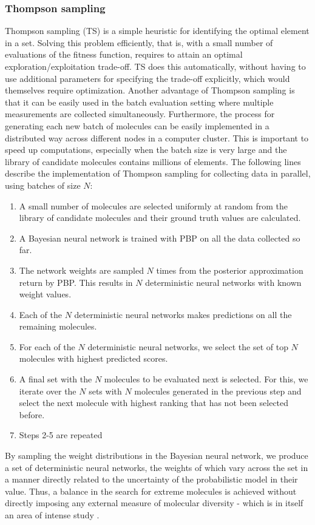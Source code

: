 \subsubsection{Thompson sampling}

Thompson sampling (TS) \cite{Thompson_1933} is a simple heuristic for identifying the optimal element in a set. Solving this problem efficiently, that is, with a small number of evaluations of the fitness function, requires to attain an optimal exploration/exploitation trade-off. TS does this automatically, without having to use additional parameters for specifying the trade-off explicitly, which would themselves require optimization. Another advantage of Thompson sampling is that it can be easily used
in the batch evaluation setting where multiple measurements are collected simultaneously. Furthermore, the process for generating each new batch of molecules can be easily implemented in a distributed way across different nodes in a computer cluster. This is important to speed up computations, especially when the batch size is very large and the library of candidate molecules contains millions of elements. The following lines describe the implementation of Thompson sampling for collecting data in parallel, using batches of size $N$:
\begin{enumerate}
\item A small number of molecules are selected uniformly at random from the library of candidate molecules and their ground truth values are calculated.
\item A Bayesian neural network is trained with PBP on all the data collected so far.
\item The network weights are sampled $N$ times from the posterior approximation return by PBP. This results in $N$ deterministic neural networks with known weight values.
\item Each of the $N$ deterministic neural networks makes predictions on all the remaining molecules.
\item For each of the $N$ deterministic neural networks, we select the set of top $N$ molecules with highest predicted scores.
\item A final set with the $N$ molecules to be evaluated next is selected. For this, we iterate over the $N$ sets with $N$ molecules generated in the previous step and select the next molecule with highest ranking that has not been selected before.
\item Steps 2-5 are repeated
\end{enumerate}
By sampling the weight distributions in the Bayesian neural network, we produce a set of deterministic neural networks, the weights of which vary across the set in a manner directly related to the uncertainty of the probabilistic model in their value.  Thus, a balance in the search for extreme molecules is achieved without directly imposing any external measure of molecular diversity - which is in itself an area of intense study \cite{Maldonado_2006}.